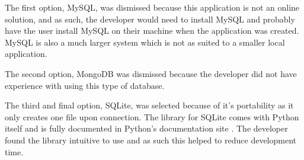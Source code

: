 The first option, MySQL, was dismissed because this application is not an online solution, and as such, the developer would need to install MySQL and probably have the user install MySQL on their machine when the application was created. MySQL is also a much larger system which is not as suited to a smaller local application.

The second option, MongoDB was dismissed because the developer did not have experience with using this type of database.

The third and final option, SQLite, was selected because of it's portability as it only creates one file upon connection. The library for SQLite comes with Python itself and is fully documented in Python's documentation site \parencite{PythonSQLite}. The developer found the library intuitive to use and as such this helped to reduce development time.

